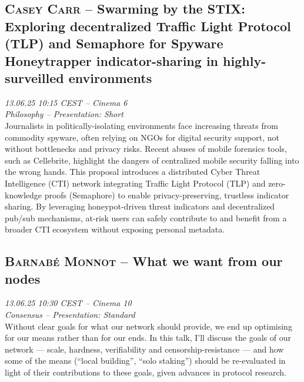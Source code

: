 \clearpage
\subsection {\textsc{Casey Carr}  -- Swarming by the STIX: Exploring decentralized Traffic Light Protocol (TLP) and Semaphore for Spyware Honeytrapper indicator-sharing in highly-surveilled environments} \noindent \textit {13.06.25 10:15 CEST -- Cinema 6\\ Philosophy -- Presentation: Short}\\[1em] Journalists in politically-isolating environments face increasing threats from commodity spyware, often relying on NGOs for digital security support, not without bottlenecks and privacy risks. Recent abuses of mobile forensics tools, such as Cellebrite, highlight the dangers of centralized mobile security falling into the wrong hands. This proposal introduces a distributed Cyber Threat Intelligence (CTI) network integrating Traffic Light Protocol (TLP) and zero-knowledge proofs (Semaphore) to enable privacy-preserving, trustless indicator sharing. By leveraging honeypot-driven threat indicators and decentralized pub/sub mechanisms, at-risk users can safely contribute to and benefit from a broader CTI ecosystem without exposing personal metadata.

\clearpage
\subsection {\textsc{Barnabé Monnot}  -- What we want from our nodes} \noindent \textit {13.06.25 10:30 CEST -- Cinema 10\\ Consensus -- Presentation: Standard}\\[1em] Without clear goals for what our network should provide, we end up optimising for our means rather than for our ends. In this talk, I'll discuss the goals of our network — scale, hardness, verifiability and censorship-resistance — and how some of the means (``local building'', ``solo staking'') should be re-evaluated in light of their contributions to these goals, given advances in protocol research.

\clearpage
